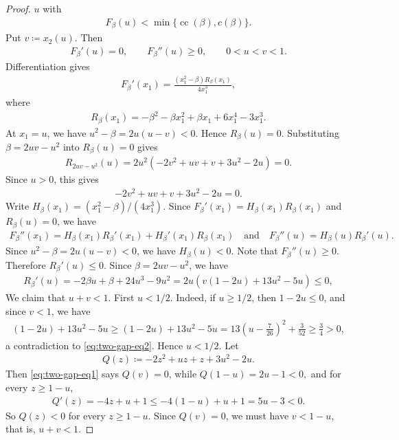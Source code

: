 \documentclass[10pt,a4paper]{article}
\newcommand{\cc}{\operatorname{cc}}
\begin{document}
\begin{proof}
$u$ with
\begin{align*}
  F_\beta(u)<\min\{\cc(\beta),c(\beta)\}.
\end{align*}
Put $v\coloneqq x_2(u)$.  Then
\begin{align*}
  F_\beta'(u)=0,
  \qquad
  F_\beta''(u)\ge0,
  \qquad
  0<u<v<1.
\end{align*}
Differentiation gives
\begin{align*}
  F_\beta'(x_1)=\frac{(x_1^2-\beta)R_\beta(x_1)}{4x_1^3},
\end{align*}
where
\begin{align*}
  R_\beta(x_1)=-\beta^2-\beta x_1^2+\beta x_1+6x_1^4-3x_1^3.
\end{align*}
At $x_1=u$, we have $u^2-\beta=2u(u-v)<0$.  Hence $R_\beta(u)=0$.  Substituting $\beta=2uv-u^2$ into $R_\beta(u)=0$ gives
\begin{align*}
  R_{2uv-u^2}(u)=2u^2(-2v^2+uv+v+3u^2-2u)=0.
\end{align*}
Since $u>0$, this gives
\begin{align}\label{eq:two-gap-eq1}
  -2v^2+uv+v+3u^2-2u=0.
\end{align}
Write $H_\beta(x_1)=(x_1^2-\beta)/(4x_1^3)$.  Since $F_\beta'(x_1)=H_\beta(x_1)R_\beta(x_1)$ and $R_\beta(u)=0$, we have
\begin{align*}
  F_\beta''(x_1)=H_\beta(x_1)R_\beta'(x_1)+H_\beta'(x_1)R_\beta(x_1)\quad\text{and}\quad F_\beta''(u)=H_\beta(u)R_\beta'(u).
\end{align*}
Since $u^2-\beta=2u(u-v)<0$, we have $H_\beta(u)<0$. Note that $F_\beta''(u)\ge0$.  Therefore $R_\beta'(u)\le0$.  Since $\beta=2uv-u^2$, we have
\begin{align}\label{eq:two-gap-eq2}
  R_\beta'(u)=-2\beta u+\beta+24u^3-9u^2=2u(v(1-2u)+13u^2-5u)\le0,
\end{align}
We claim that $u+v<1$.  First $u<1/2$.  Indeed, if $u\ge1/2$, then $1-2u\le0$, and since $v<1$, we have
\begin{align*}
  (1-2u)+13u^2-5u\ge(1-2u)+13u^2-5u=13\left(u-\frac{7}{26}\right)^2+\frac{3}{52}\ge\frac34>0,
\end{align*}
a contradiction to \eqref{eq:two-gap-eq2}.  Hence $u<1/2$.  Let
\begin{align*}
  Q(z)\coloneqq-2z^2+uz+z+3u^2-2u.
\end{align*}
Then \eqref{eq:two-gap-eq1} says $Q(v)=0$, while
$
  Q(1-u)=2u-1<0,
$
and for every $z\ge1-u$,
\begin{align*}
  Q'(z)=-4z+u+1\le -4(1-u)+u+1=5u-3<0.
\end{align*}
So $Q(z)<0$ for every $z\ge1-u$.  Since $Q(v)=0$, we must have $v<1-u$, that is, $u+v<1$.


\end{proof}
\end{document}

